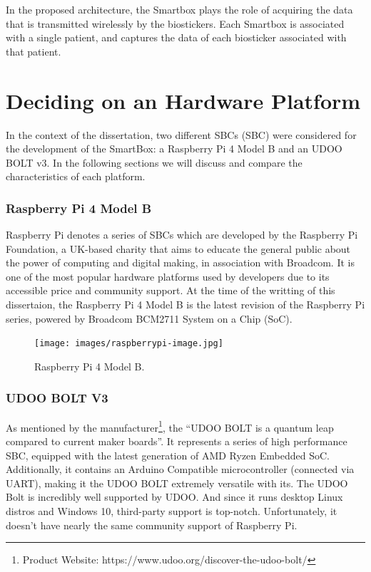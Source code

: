 
In the proposed architecture, the Smartbox plays the role of acquiring the data that is transmitted wirelessly by the biostickers.
Each Smartbox is associated with a single patient, and captures the data of each biosticker associated with that patient. 

\section{Deciding on an Hardware Platform}

In the context of the dissertation, two different \acl{SBC}s (\acs{SBC}) were considered for the development of the SmartBox: a Raspberry Pi 4 Model B and an UDOO BOLT v3. In the following sections we will discuss and compare the characteristics of each platform. 

\subsubsection{Raspberry Pi 4 Model B}

Raspberry Pi denotes a series of \acs{SBC}s which are developed by the Raspberry Pi Foundation, a UK-based charity that aims to educate the general public about the power of computing and digital making, in association with Broadcom. It is one of the most popular hardware platforms used by developers due to its accessible price and community support.
At the time of the writting of this dissertaion, the Raspberry Pi 4 Model B is the latest revision of the Raspberry Pi series, powered by Broadcom BCM2711 System on a Chip (SoC).

\begin{figure}[H]
    \centering
    \texttt{[image: images/raspberrypi-image.jpg]}
    \caption{Raspberry Pi 4 Model B.}
    \label{fig:raspberrypi-image}
\end{figure}

\subsubsection{UDOO BOLT V3}

As mentioned by the manufacturer\footnote{Product Website: https://www.udoo.org/discover-the-udoo-bolt/}, the ``UDOO BOLT is a quantum leap compared to current maker boards''. It represents a series of high performance \acs{SBC}, equipped with the latest generation of AMD Ryzen Embedded SoC. Additionally, it contains an Arduino Compatible microcontroller (connected via UART), making it the UDOO BOLT extremely versatile with its.
The UDOO Bolt is incredibly well supported by UDOO. And since it runs desktop Linux distros and Windows 10, third-party support is top-notch. Unfortunately, it doesn't have nearly the same community support of Raspberry Pi.

